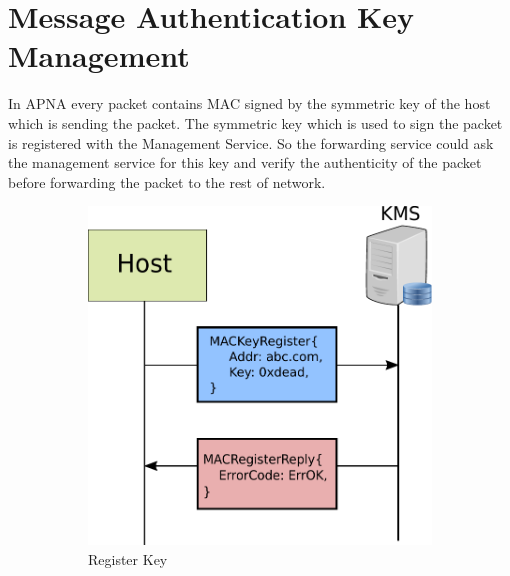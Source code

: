 \section{Message Authentication Key Management} \label{sec:kms}
In APNA every packet contains MAC signed by the symmetric key of the host which is sending the packet. The symmetric key which is used to sign the packet is registered with the Management Service. So the forwarding service could ask the management service for this key and verify the authenticity of the packet before forwarding the packet to the rest of network.

\begin{figure}[th!]
\centering
\begin{subfigure}{.5\textwidth}
  \centering
  \includegraphics[width=0.95\linewidth]{Figures/kms.pdf}
  \caption[MAC Key Register]{Register Key}
  \label{fig:kms_register}
\end{subfigure}%
\begin{subfigure}{.5\textwidth}
  \centering

\end{subfigure}
\end{figure}
